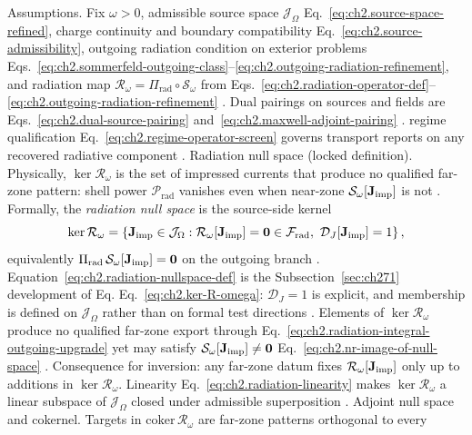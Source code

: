 Assumptions. Fix \(\omega>0\), admissible source space \(\mathcal{J}_\Omega\)
Eq.~\eqref{eq:ch2.source-space-refined}, charge continuity and boundary compatibility
Eq.~\eqref{eq:ch2.source-admissibility}, outgoing radiation condition on exterior problems
Eqs.~\eqref{eq:ch2.sommerfeld-outgoing-class}--\eqref{eq:ch2.outgoing-radiation-refinement},
and radiation map \(\mathcal{R}_\omega=\Pi_{\mathrm{rad}}\circ\mathcal{S}_\omega\) from
Eqs.~\eqref{eq:ch2.radiation-operator-def}--\eqref{eq:ch2.outgoing-radiation-refinement}
\cite{stratton1941}. Dual pairings on sources and fields are
Eqs.~\eqref{eq:ch2.dual-source-pairing} and~\eqref{eq:ch2.maxwell-adjoint-pairing}
\cite{stratton1941}. regime qualification Eq.~\eqref{eq:ch2.regime-operator-screen} governs transport
reports on any recovered radiative component \cite{harrington2001}.
Radiation null space (locked definition). Physically, $\ker\mathcal{R}_\omega$ is the set of impressed currents that produce no qualified
far-zone pattern: shell power $\mathcal{P}_{\mathrm{rad}}$ vanishes even when near-zone
$\mathcal{S}_\omega[\mathbf{J}_{\mathrm{imp}}]$ is not \cite{stratton1941}. Formally, the \emph{radiation null space}
is the source-side kernel
\begin{equation}
\label{eq:ch2.radiation-nullspace-def}
\ker\mathcal{R}_\omega
=
\left\{
\mathbf{J}_{\mathrm{imp}}\in\mathcal{J}_\Omega:
\mathcal{R}_\omega[\mathbf{J}_{\mathrm{imp}}]=\mathbf{0}\in\mathcal{F}_{\mathrm{rad}},
\ \mathcal{D}_{J}[\mathbf{J}_{\mathrm{imp}}]=1
\right\},
\end{equation}
equivalently \(\Pi_{\mathrm{rad}}\,\mathcal{S}_\omega[\mathbf{J}_{\mathrm{imp}}]=\mathbf{0}\) on the outgoing
branch \cite{stratton1941}. Equation~\eqref{eq:ch2.radiation-nullspace-def}
is the Subsection~\ref{sec:ch271} development of Eq.
Eq.~\eqref{eq:ch2.ker-R-omega}: $\mathcal{D}_J=1$ is explicit, and membership is
defined on \(\mathcal{J}_\Omega\) rather than on formal test directions
\cite{stratton1941}. Elements of \(\ker\mathcal{R}_\omega\) produce no qualified far-zone
export through Eq.~\eqref{eq:ch2.radiation-integral-outgoing-upgrade} yet may satisfy
\(\mathcal{S}_\omega[\mathbf{J}_{\mathrm{imp}}]\neq\mathbf{0}\) Eq.~\eqref{eq:ch2.nr-image-of-null-space}
\cite{harrington2001}. Consequence for inversion: any far-zone datum fixes
\(\mathcal{R}_\omega[\mathbf{J}_{\mathrm{imp}}]\) only up to additions in \(\ker\mathcal{R}_\omega\). Linearity
Eq.~\eqref{eq:ch2.radiation-linearity} makes \(\ker\mathcal{R}_\omega\) a linear subspace of
\(\mathcal{J}_\Omega\) closed under admissible superposition \cite{stratton1941}.
Adjoint null space and cokernel. Targets in \(\mathrm{coker}\,\mathcal{R}_\omega\) are far-zone patterns orthogonal to every
